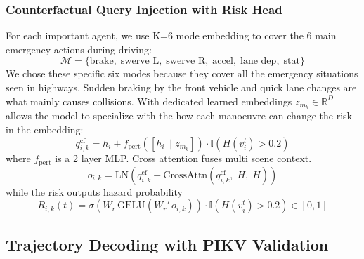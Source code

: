 \documentclass[preprint,12pt]{elsarticle}
\begin{document}
\subsubsection{Counterfactual Query Injection with Risk Head}
For each important agent, we use K=6 mode embedding to cover the 6 main emergency actions during driving:
\begin{equation}
    \mathcal{M} = \{\text{brake}, \; \text{swerve\_L}, \; \text{swerve\_R}, \; \text{accel}, \; \text{lane\_dep}, \; \text{stat}\}
    \label{eq_modes}
\end{equation}
We chose these specific six modes because they cover all the emergency situations seen in highways. Sudden braking by the front vehicle and quick lane changes are what mainly causes collisions. With dedicated learned embeddings ${z}_{m_k} \in \mathbb{R}^D$ allows the model to specialize with the how each manoeuvre can change the risk in the embedding:
\begin{equation}
    {q}_{i,k}^{\text{cf}} = {h}_i + f_{\text{pert}}\left(\left[{h}_i \| {z}_{m_k}\right]\right) \cdot \mathbb{I}\left(H(v_i^t) > 0.2\right)
    \label{eq_cf_query}
\end{equation}
where $f_{\text{pert}}$ is a 2 layer MLP. Cross attention fuses multi scene context.
\begin{equation}
    {o}_{i,k} = \text{LN}\left({q}_{i,k}^{\text{cf}} + \text{CrossAttn}\left({q}_{i,k}^{\text{cf}}, \; {H}, \; {H}\right)\right)
    \label{eq_cf_attn}
\end{equation}
while the risk outputs hazard probability
\begin{equation}
    R_{i,k}(t) = \sigma\left({W}_r \, \text{GELU}\left({W}_r' \, {o}_{i,k}\right)\right) \cdot \mathbb{I}\left(H(v_i^t) > 0.2\right) \in [0, 1]
    \label{eq_risk_logit}
\end{equation}

\subsection{Trajectory Decoding with PIKV Validation}
\end{document}
